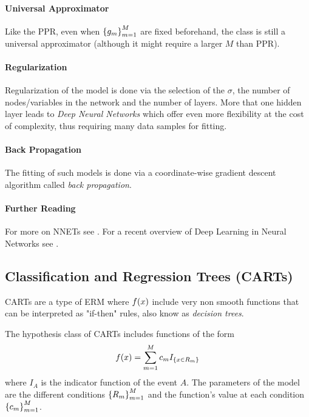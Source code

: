 \paragraph{Universal Approximator}
Like the PPR, even when $\left\{ g_m \right\}_{m=1}^M$ are fixed beforehand, the class is still a universal approximator (although it might require a larger $M$ than PPR).

\paragraph{Regularization}
Regularization of the model is done via the selection of the $\sigma$, the number of nodes/variables in the network and the number of layers. More that one hidden layer leads to \emph{Deep Neural Networks} which offer even more flexibility at the cost of complexity, thus requiring many data samples for fitting.

\paragraph{Back Propagation}
The fitting of such models is done via a coordinate-wise gradient descent algorithm called \emph{back propagation}.

\paragraph{Further Reading}
For more on NNETs see \citep[Chapter 11]{hastie_elements_2003}.
For a recent overview of Deep Learning in Neural Networks see \cite{schmidhuber_deep_2015}.




\subsection{Classification and Regression Trees (CARTs)}
CARTs are a type of ERM where $f(x)$ include very non smooth functions that can be interpreted as "if-then" rules, also know as \emph{decision trees}.

The hypothesis class of CARTs includes functions of the form
\begin{align}
\label{eq:decision_list}
	f(x)=\sum_{m=1}^M c_m I_{\left\{ x \in R_m \right\}}
\end{align}
where $I_A$ is the indicator function of the event $A$.
The parameters of the model are the different conditions $\left\{ R_m \right\}_{m=1}^M$ and the function's value at each condition $\left\{ c_m \right\}_{m=1}^M$. 

